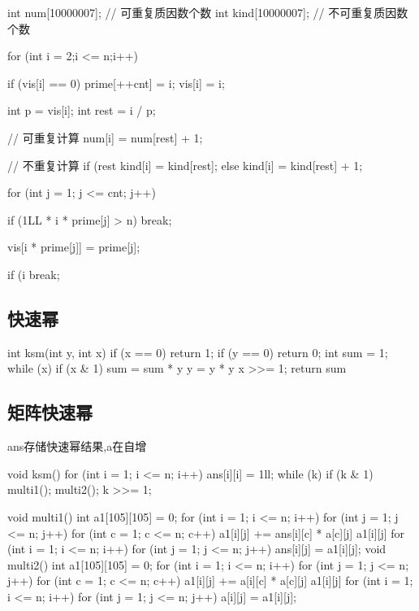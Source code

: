 \documentclass[UTF8,a4paper,11pt]{ctexart}
\newcommand{\topic}[1]{%
  \par\needspace{3\baselineskip}\vspace{0.45em}%
  \noindent{\bfseries\color{Primary}#1}\par\vspace{0.12em}%
}
\begin{document}
\begin{CodeBlock}
int num[10000007];      // 可重复质因数个数
int kind[10000007];     // 不可重复质因数个数

for (int i = 2;i <= n;i++) {
    if (vis[i] == 0) {
        prime[++cnt] = i;
        vis[i] = i;
    }

    int p = vis[i];
    int rest = i / p;

    // 可重复计算
    num[i] = num[rest] + 1;

    // 不重复计算
    if (rest %
        kind[i] = kind[rest];
    else
        kind[i] = kind[rest] + 1;

    for (int j = 1; j <= cnt; j++) {
        if (1LL * i * prime[j] > n)
            break;

        vis[i * prime[j]] = prime[j];

        if (i %
            break;
    }
}
\end{CodeBlock}

\subsection{快速幂}

\topic{快速幂模板}

\begin{CodeBlock}
int ksm(int y, int x) {
    if (x == 0)
        return 1;
    if (y == 0)
        return 0;
    int sum = 1;
    while (x) {
        if (x & 1)
            sum = sum * y %
        y = y * y %
        x >>= 1;
    }
    return sum %
}
\end{CodeBlock}

\subsection{矩阵快速幂}

\topic{矩阵乘法模板}

ans存储快速幂结果,a在自增

\begin{CodeBlock}
void ksm() {
    for (int i = 1; i <= n; i++)
        ans[i][i] = 1ll;
    while (k) {
        if (k & 1)
            multi1();
        multi2();
        k >>= 1;
    }
}
\end{CodeBlock}

\begin{CodeBlock}
void multi1() {
    int a1[105][105] = {0};
    for (int i = 1; i <= n; i++)
        for (int j = 1; j <= n; j++)
            for (int c = 1; c <= n; c++) {
                a1[i][j] += ans[i][c] * a[c][j] %
                a1[i][j] %
            }
    for (int i = 1; i <= n; i++)
        for (int j = 1; j <= n; j++)
            ans[i][j] = a1[i][j];
}
void multi2() {
    int a1[105][105] = {0};
    for (int i = 1; i <= n; i++)
        for (int j = 1; j <= n; j++)
            for (int c = 1; c <= n; c++) {
                a1[i][j] += a[i][c] * a[c][j] %
                a1[i][j] %
            }
    for (int i = 1; i <= n; i++)
        for (int j = 1; j <= n; j++)
            a[i][j] = a1[i][j];
}
\end{CodeBlock}
\end{document}
